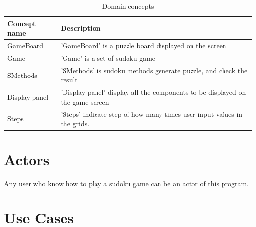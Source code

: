 \documentclass[12pt]{article}
\begin{document}
\begin{table}[h]
\begin{center}
\begin{tabular}{| l | l |}
\hline
Concept name & Description \\
\hline\hline
GameBoard & 'GameBoard' is a puzzle board displayed on the screen \\
\hline
Game & 'Game' is a set of sudoku game \\
\hline
SMethods & 'SMethods' is sudoku methods generate puzzle, and check the result  \\
\hline
Display panel &  'Display panel' display all the components to be displayed on the game screen \\
\hline
Steps & 'Steps' indicate step of how many times user input values in the grids. \\
\hline
\end{tabular}
\end{center}
\caption{Domain concepts}
\end{table}

\section{Actors}
Any user who know how to play a sudoku game can be an actor of this program.
\section{Use Cases}
\end{document}
